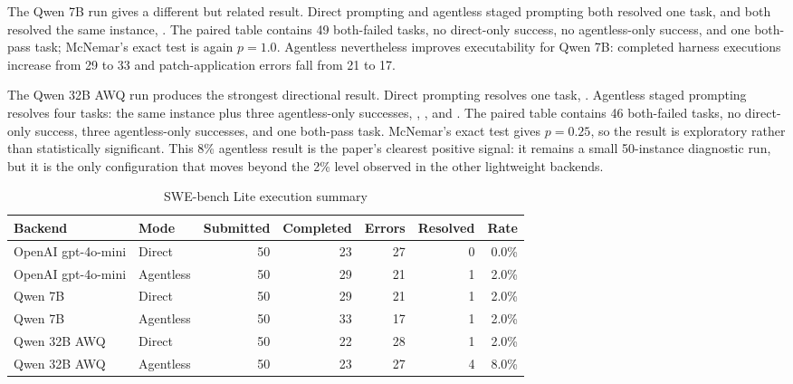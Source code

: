 \documentclass[preprint,12pt]{elsarticle}
\begin{document}
The Qwen 7B run gives a different but related result. Direct prompting and agentless staged prompting both resolved one task, and both resolved the same instance, . The paired table contains 49 both-failed tasks, no direct-only success, no agentless-only success, and one both-pass task; McNemar's exact test is again $p = 1.0$. Agentless nevertheless improves executability for Qwen 7B: completed harness executions increase from 29 to 33 and patch-application errors fall from 21 to 17.

The Qwen 32B AWQ run produces the strongest directional result. Direct prompting resolves one task, . Agentless staged prompting resolves four tasks: the same  instance plus three agentless-only successes, , , and . The paired table contains 46 both-failed tasks, no direct-only success, three agentless-only successes, and one both-pass task. McNemar's exact test gives $p = 0.25$, so the result is exploratory rather than statistically significant. This 8\% agentless result is the paper's clearest positive signal: it remains a small 50-instance diagnostic run, but it is the only configuration that moves beyond the 2\% level observed in the other lightweight backends.

\begin{table}[htbp]
\centering
\caption{SWE-bench Lite execution summary}
\label{tab:swebench_summary}
\begin{adjustbox}{max width=0.94\linewidth}
\begin{tabular}{llrrrrr}
\toprule
Backend & Mode & Submitted & Completed & Errors & Resolved & Rate \\
\midrule
OpenAI gpt-4o-mini & Direct & 50 & 23 & 27 & 0 & 0.0\% \\
OpenAI gpt-4o-mini & Agentless & 50 & 29 & 21 & 1 & 2.0\% \\
Qwen 7B & Direct & 50 & 29 & 21 & 1 & 2.0\% \\
Qwen 7B & Agentless & 50 & 33 & 17 & 1 & 2.0\% \\
Qwen 32B AWQ & Direct & 50 & 22 & 28 & 1 & 2.0\% \\
Qwen 32B AWQ & Agentless & 50 & 23 & 27 & 4 & 8.0\% \\
\bottomrule
\end{tabular}
\end{adjustbox}
\end{table}
\end{document}

